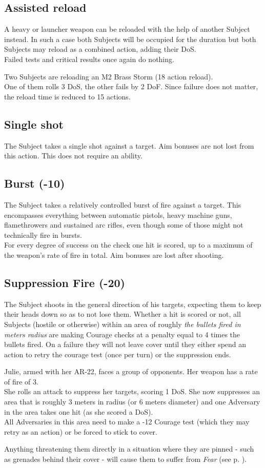 \subsection*{Assisted reload}
A heavy or launcher weapon can be reloaded with the help of another Subject instead.
In such a case both Subjects will be occupied for the duration
	but both Subjects may reload as a combined action, adding their DoS.
\\%
Failed tests and critical results once again do nothing.
\begin{exampleblock}
	Two Subjects are reloading an M2 Brass Storm (18 action reload).
	\\%
	One of them rolls 3 DoS, the other fails by 2 DoF.
	Since failure does not matter, the reload time is reduced to 15 actions.
\end{exampleblock}
\subsection*{Single shot}
The Subject takes a single shot against a target.
Aim bonuses are not lost from this action.
This does not require an ability.
\subsection*{Burst (-10)}
The Subject takes a relatively controlled burst of fire against a target.
This encompasses everything between automatic pistols, heavy machine guns, flamethrowers and sustained arc rifles, even though some of those might not technically fire in bursts.
\\%
For every degree of success on the check one hit is scored,
	up to a maximum of the weapon’s rate of fire in total.
Aim bonuses are lost after shooting.
\subsection*{Suppression Fire (-20)}
The Subject shoots in the general direction of his targets,
	expecting them to keep their heads down so as to not lose them.
Whether a hit is scored or not, all Subjects (hostile or otherwise) within an area of
	roughly \emph{the bullets fired in meters radius}
	are making Courage checks at a penalty equal to
	4 times the bullets fired.
On a failure they will not leave cover until they either spend an action to retry the courage test (once per turn) or the suppression ends.
\begin{exampleblock}
	Julie, armed with her AR-22, faces a group of opponents.
	Her weapon has a rate of fire of 3.
	\\%
	She rolls an attack to suppress her targets, scoring 1 DoS.
	She now suppresses an area that is roughly
		3 meters in radius (or 6 meters diameter)
		and one Adversary in the area takes one hit (as she scored a DoS).
	\\%
	All Adversaries in this area need to make a
		-12 Courage test
		(which they may retry as an action)
		or be forced to stick to cover.
\end{exampleblock}
Anything threatening them directly in a situation where they are pinned
	- such as grenades behind their cover -
	will cause them to suffer from \emph{Fear} (see p. \pageref{sec:fear}).
